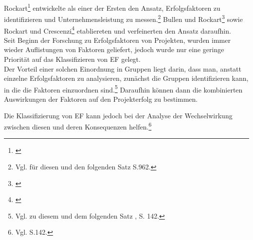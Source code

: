 Rockart\footnote{\cite{Rockart.1979}} entwickelte als einer der Ersten den Ansatz, Erfolgsfaktoren zu identifizieren und Unternehmensleistung zu messen.\footnote{Vgl. für diesen und den folgenden Satz \cite{Chow.2008} S.962.}
Bullen und Rockart\footnote{\cite{Bullen.1981}} sowie Rockart und Crescenzi\footnote{\cite{Rockart.1984}} etabliereten und verfeinerten den Ansatz daraufhin.\\
Seit Beginn der Forschung zu Erfolgsfaktoren von Projekten, wurden immer wieder Auflistungen von Faktoren 
geliefert, jedoch wurde nur eine geringe Priorität auf das Klassifizieren von EF gelegt.\\\noindent
Der Vorteil einer solchen Einordnung in Gruppen liegt darin, dass man, anstatt einzelne Erfolgsfaktoren zu analysieren, zunächst die Gruppen identifizieren kann, in die die Faktoren
einzuordnen sind.\footnote{Vgl. zu diesem und dem folgenden Satz \cite{Belassi.1996}, S. 142.} Daraufhin können dann die kombinierten Auswirkungen der Faktoren auf den Projekterfolg zu bestimmen.

Die Klassifizierung von EF kann jedoch bei der Analyse der Wechselwirkung zwischen diesen und deren Konsequenzen helfen.\footnote{Vgl. \cite{Belassi.1996} S.142.} 



